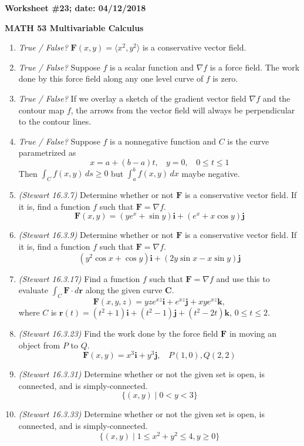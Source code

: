 \documentclass{article}
\newcommand{\ii}{\mathbf{i}}
\newcommand{\jj}{\mathbf{j}}
\newcommand{\kk}{\mathbf{k}}
\newcommand{\rr}{\mathbf{r}}
\begin{document}
{\bf Worksheet \#23; date: 04/12/2018}

{\bf MATH 53 Multivariable Calculus}

\begin{enumerate}
\item {\em True / False?} $\mathbf{F}(x, y) = \langle x^2, y^2 \rangle$ is a conservative vector field.

\item {\em True / False?} Suppose $f$ is a scalar function and $\nabla f$ is a force field. The work done by this force field along any one level curve of $f$ is zero.

\item {\em True / False?} If we overlay a sketch of the gradient vector field $\nabla f$ and the contour map $f$, the arrows from the vector field will always be perpendicular to the contour lines.

\item {\em True / False?} Suppose $f$ is a nonnegative function and $C$ is the curve parametrized as
\[
x = a + (b - a)t, ~~~~ y = 0, ~~~~ 0 \le t \le 1
\]
Then $\int_C f(x, y) \,ds \ge 0$ but $\int_a^b f(x, y) \,dx$ maybe negative.

\item {\em (Stewart 16.3.7)} Determine whether or not $\mathbf{F}$ is a conservative vector field. If it is, find a function $f$ such that $\mathbf{F} = \nabla f$.
\[
\mathbf{F}(x, y) = (ye^x + \sin y) \ii + (e^x + x \cos y) \jj
\]

\item {\em (Stewart 16.3.9)} Determine whether or not $\mathbf{F}$ is a conservative vector field. If it is, find a function $f$ such that $\mathbf{F} = \nabla f$.
\[
(y^2 \cos x + \cos y) \ii + (2y \sin x - x \sin y) \jj
\]

\item {\em (Stewart 16.3.17)} Find a function $f$ such that $\mathbf{F} = \nabla f$ and use this to evaluate $\int_C \mathbf{F} \cdot d\rr$ along the given curve $\mathbf{C}$.
\[
\mathbf{F}(x, y, z) = yze^{xz} \ii + e^{xz} \jj + xye^{xz} \kk,
\]
where $C$ is $\rr(t) = (t^2 + 1) \ii + (t^2 - 1) \jj + (t^2 - 2t) \kk$, $0 \le t \le 2$.

\item {\em (Stewart 16.3.23)} Find the work done by the force field $\mathbf{F}$ in moving an object from $P$ to $Q$.
\[
\mathbf{F}(x, y) = x^3 \ii + y^3 \jj, ~~~~ P(1, 0), Q(2, 2)
\]

\item {\em (Stewart 16.3.31)} Determine whether or not the given set is open, is connected, and is simply-connected.
\[
\{(x, y) \;|\; 0 < y < 3\}
\]

\item {\em (Stewart 16.3.33)} Determine whether or not the given set is open, is connected, and is simply-connected.
\[
\{(x, y) \;|\; 1 \le x^2 + y^2 \le 4, y \ge 0\}
\]
\end{enumerate}
\end{document}
